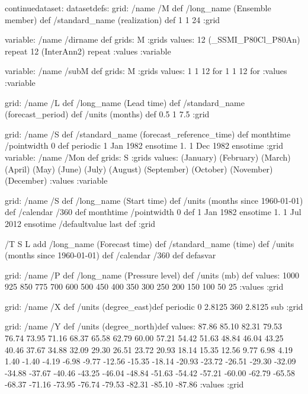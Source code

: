 \begin{ingrid}

continuedataset:
datasetdefs:
grid:
/name /M def
/long_name (Ensemble member) def
/standard_name (realization) def
1 1 24
:grid

variable: 
/name /dirname def
grids: M :grids
values: 12 (_SSMI_P80Cl_P80An) repeat 12 (InterAnn2) repeat :values
:variable


variable:
/name /subM def
grids: M :grids
values: 1 1 12 {}
for 1 1 12 {}
for :values
:variable 

grid:
/name /L def
/long_name (Lead time) def
/standard_name (forecast_period) def
/units (months) def
0.5 1 7.5
:grid

grid:
/name /S def
/standard_name (forecast_reference_time) def
monthtime
/pointwidth 0 def
periodic
1 Jan 1982 ensotime
1.
1 Dec 1982 ensotime
:grid
variable:
/name /Mon def
grids: S :grids
values:
(January)
(February)
(March)
(April)
(May)
(June)
(July)
(August)
(September)
(October)
(November)
(December)
:values
:variable

grid:
/name /S def
/long_name (Start time) def
/units (months since 1960-01-01) def
/calendar /360 def
monthtime
/pointwidth 0 def 
1 Jan 1982 ensotime
1.
1 Jul 2012 ensotime
/defaultvalue {last} def
:grid

/T { 
S L add
/long_name (Forecast time) def
/standard_name (time) def
/units (months since 1960-01-01) def
/calendar /360 def
 }defasvar


grid:
/name /P def
/long_name (Pressure level) def
/units (mb) def
values: 
1000 925 850 775 700 600 500 450 400 350 300 250 200 150 100 50 25 
:values
:grid

grid:
/name /X def
/units (degree_east)def
 periodic
 0 2.8125 360  2.8125 sub
:grid

grid:
/name /Y def
/units (degree_north)def
values:
87.86 85.10 82.31 79.53 76.74 73.95 71.16 68.37
 65.58 62.79 60.00 57.21 54.42 51.63 48.84 46.04 43.25 40.46
 37.67 34.88 32.09 29.30 26.51 23.72 20.93 18.14 15.35 12.56
 9.77  6.98  4.19  1.40   -1.40   -4.19   -6.98   -9.77  -12.56  -15.35
 -18.14  -20.93  -23.72  -26.51  -29.30  -32.09  -34.88  -37.67  -40.46  -43.25
 -46.04  -48.84  -51.63  -54.42  -57.21  -60.00  -62.79  -65.58  -68.37  -71.16
 -73.95  -76.74  -79.53  -82.31  -85.10  -87.86
:values
:grid


\end{ingrid}
